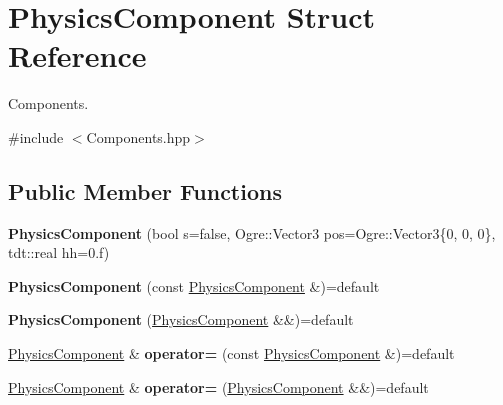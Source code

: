 \hypertarget{struct_physics_component}{}\section{Physics\+Component Struct Reference}
\label{struct_physics_component}


Components.  




{\ttfamily \#include $<$Components.\+hpp$>$}

\subsection*{Public Member Functions}
\begin{DoxyCompactItemize}
\item 
{\bfseries Physics\+Component} (bool s=false, Ogre\+::\+Vector3 pos=Ogre\+::\+Vector3\{0, 0, 0\}, tdt\+::real hh=0.f)\hypertarget{struct_physics_component_ab1cb618d94011e593f1c522a7485f878}{}\label{struct_physics_component_ab1cb618d94011e593f1c522a7485f878}

\item 
{\bfseries Physics\+Component} (const \hyperlink{struct_physics_component}{Physics\+Component} \&)=default\hypertarget{struct_physics_component_ad1253f440a9d3cd2199a91a5f0371dd9}{}\label{struct_physics_component_ad1253f440a9d3cd2199a91a5f0371dd9}

\item 
{\bfseries Physics\+Component} (\hyperlink{struct_physics_component}{Physics\+Component} \&\&)=default\hypertarget{struct_physics_component_ac9387a296d252e63021a03ca66bfffdc}{}\label{struct_physics_component_ac9387a296d252e63021a03ca66bfffdc}

\item 
\hyperlink{struct_physics_component}{Physics\+Component} \& {\bfseries operator=} (const \hyperlink{struct_physics_component}{Physics\+Component} \&)=default\hypertarget{struct_physics_component_a83a73045999afdafb0ec5b1ee803e025}{}\label{struct_physics_component_a83a73045999afdafb0ec5b1ee803e025}

\item 
\hyperlink{struct_physics_component}{Physics\+Component} \& {\bfseries operator=} (\hyperlink{struct_physics_component}{Physics\+Component} \&\&)=default\hypertarget{struct_physics_component_a1b9671d67f08794d09b1577fe45ec9f9}{}\label{struct_physics_component_a1b9671d67f08794d09b1577fe45ec9f9}

\end{DoxyCompactItemize}
